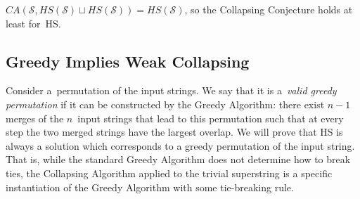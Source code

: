 \begin{corollary}
    $CA(\mathcal{S}, HS(\mathcal{S})\sqcup HS(\mathcal{S})) = HS(\mathcal{S})$, so the Collapsing Conjecture holds at least for~HS.
\end{corollary}


\subsection{Greedy Implies Weak Collapsing}
\label{sec:gr_im_wcc}
Consider a~permutation of the input strings. We say that it is a~{\em valid greedy permutation} if it can be constructed by the Greedy Algorithm: there exist $n-1$ merges of the $n$~input strings that lead to this permutation such that at every step the two merged strings have the largest overlap. We will prove that HS is always a solution which corresponds to a greedy permutation of the input string. That is, while the standard Greedy Algorithm does not determine how to break ties, the Collapsing Algorithm applied to the trivial superstring is a specific instantiation of the Greedy Algorithm with some tie-breaking rule.

